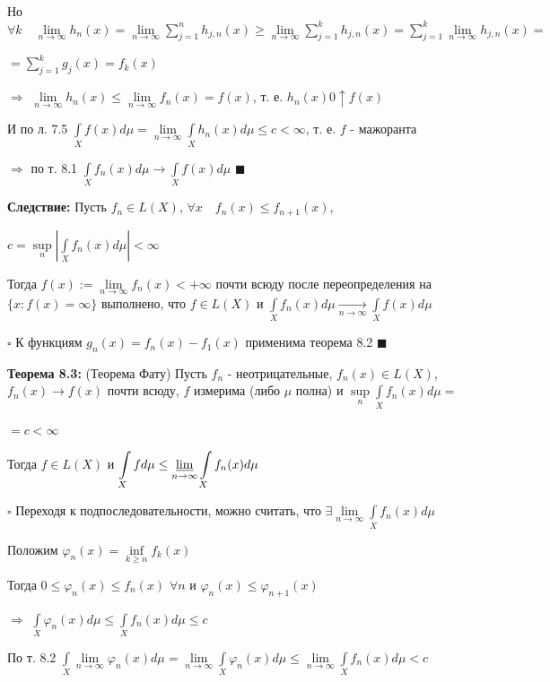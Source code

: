 \documentclass[a4paper]{report}
\begin{document}
Но $\forall k\quad\lim\limits_{n\to\infty}h_n(x)=\lim\limits_{n\to\infty}\sum\limits_{j=1}^n h_{j,n}(x)\ge\lim\limits_{n\to\infty}\sum\limits_{j=1}^k h_{j,n}(x)=
\sum\limits_{j=1}^k\lim\limits_{n\to\infty} h_{j,n}(x)=$

\noindent $=\sum\limits_{j=1}^k g_j(x)=f_k(x)$

$\Rightarrow$ $\lim\limits_{n\to\infty} h_n(x)\le\lim\limits_{n\to\infty}f_n(x)=f(x)$, т. е. $h_n(x)0\uparrow f(x)$ 

И по л. 7.5 $\displaystyle\int\limits_X f(x)d\mu=\lim\limits_{n\to\infty}\displaystyle\int\limits_X h_n(x)d\mu\le c<\infty$, т. е. $f$ - мажоранта

$\Rightarrow$ по т. 8.1 $\displaystyle\int\limits_X f_n(x) d\mu\to\displaystyle\int\limits_X f(x)d\mu$ $\blacksquare$
\bigskip

\noindent\textbf{Следствие:} Пусть $f_n\in L(X)$, $\forall x\quad f_n(x)\le f_{n+1}(x)$, 

$c=\sup\limits_n\left|\displaystyle\int\limits_X f_n(x)d\mu\right|<\infty$

Тогда $f(x):=\lim\limits_{n\to\infty} f_n(x)<+\infty$ почти всюду после переопределения на $\{x\colon f(x)=\infty\}$ выполнено, что $f\in L(X)$ и $\displaystyle\int\limits_X f_n(x)d\mu\xrightarrow[n\to\infty]{}\displaystyle\int\limits_X f(x)d\mu$

\noindent $\square$ К функциям $g_n(x)=f_n(x)-f_1(x)$ применима теорема 8.2 $\blacksquare$
\bigskip

\noindent\textbf{Теорема 8.3:} (Теорема Фату) Пусть $f_n$ - неотрицательные, $f_n(x)\in L(X)$, $f_n(x)\to f(x)$ почти всюду, $f$ измерима (либо $\mu$ полна) и $\sup\limits_n\displaystyle\int\limits_X f_n(x)d\mu=$

\noindent$=c<\infty$

Тогда $f\in L(X)$ и $\displaystyle\int\limits_X fd\mu\le\varliminf\limits_{n\to\infty}\displaystyle\int\limits_X f_n(x)d\mu$

\noindent $\square$ Переходя к подпоследовательности, можно считать, что $\exists\lim\limits_{n\to\infty}\displaystyle\int\limits_X f_n(x)d\mu$

Положим $\varphi_n(x)=\inf\limits_{k\ge n}f_k(x)$

 Тогда $0\le\varphi_n(x)\le f_n(x)$ $\forall n$ и $\varphi_n(x)\le\varphi_{n+1}(x)$

$\Rightarrow$ $\displaystyle\int\limits_X\varphi_n(x)d\mu\le\displaystyle\int\limits_X f_n(x)d\mu\le c$

По т. 8.2 $\displaystyle\int\limits_X\lim\limits_{n\to\infty}\varphi_n(x)d\mu=\lim\limits_{n\to\infty}\displaystyle\int\limits_X\varphi_n(x)d\mu\le\lim\limits_{n\to\infty}\displaystyle\int\limits_X
f_n(x)d\mu<c$
\end{document}
